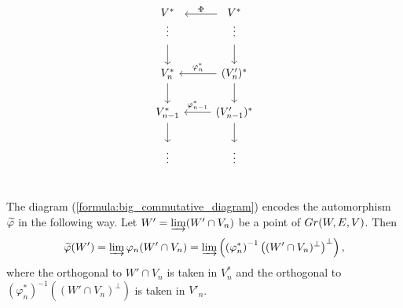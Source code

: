\documentclass[11pt, a4paper]{article}
\begin{document}
\begin{equation}\label{formula:big_commutative_diagram}
    \begin{tikzcd}
\begin{array}{c}
     V^*\\
     \vdots
\end{array} \arrow[d]  
& \begin{array}{c}
     V^*\\
     \vdots
\end{array}   \arrow[d]  \arrow[yshift=2.0ex,l,"\Phi"'] \\
V^*_n \arrow[d]
& (V'_{n})^* \arrow[l,"\varphi^*_{n}"'] \arrow[d]\\
V^*_{n-1} \arrow[d]
& (V'_{n-1})^* \arrow[l,"\varphi^*_{n-1}"'] \arrow[d]\\
\vdots & \vdots \\
\end{tikzcd}
\end{equation}




The diagram (\ref{formula:big_commutative_diagram}) encodes the automorphism $\widetilde{\varphi}$ in the following way. Let $W'=\varinjlim(W'\cap V_n)$ be a point of $Gr(W,E,V)$. Then \begin{equation}\label{formula:action_tilde_vfi_on_subspace}
    \widetilde{\varphi}(W')=\varinjlim \varphi_n(W'\cap V_n)=\varinjlim  \left(\left(\varphi_n^*\right)^{-1}\left((W'\cap V_n)^{\perp}\right)^{\perp}\right),
\end{equation} where the orthogonal to $W'\cap V_n$ is taken in $V^*_n$ and the orthogonal to $\left(\varphi_n^*\right)^{-1}\left(\left(W'\cap V_n\right)^{\perp}\right)$ is taken in $V'_n$.
\end{document}
